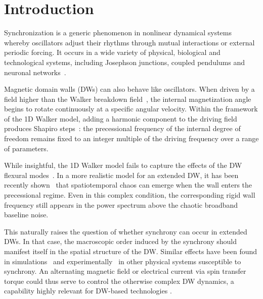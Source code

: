 \documentclass[prb,aps,twocolumn,superscriptaddress,floatfix]{revtex4-1}
\begin{document}
\maketitle


\section{Introduction}

Synchronization is a generic phenomenon in nonlinear dynamical systems whereby oscillators adjust their rhythms through mutual interactions or external periodic forcing. It occurs in a wide variety of physical, biological and technological systems, including Josephson junctions, coupled pendulums and neuronal networks~\cite{Strogatz2015,Pikovsky_Rosenblum_Kurths_2001}.

Magnetic domain walls (DWs) can also behave like oscillators. When driven by a field higher than the Walker breakdown field~\cite{Schryer1974}, the internal magnetization angle begins to rotate continuously at a specific angular velocity. Within the framework of the 1D Walker model, adding a harmonic component to the driving field produces Shapiro steps~\cite{shapiro1963josephson,berger1991prediction,kim2019}: the precessional frequency of the internal degree of freedom remains fixed to an integer multiple of the driving frequency over a range of parameters.

While insightful, the 1D Walker model fails to capture the effects of the DW flexural modes~\cite{thevenard2011domain,gourdon2013domain,Kim2024}.
In a more realistic model for an extended DW, it has been recently shown~\cite{pusiol2026deterministic} that spatiotemporal chaos can emerge when the wall enters the precessional regime. Even in this complex condition, the corresponding rigid wall frequency still appears in the power spectrum above the chaotic broadband baseline noise.

This naturally raises the question of whether synchrony can occur in extended DWs. In that case, the macroscopic order induced by the synchrony should manifest itself in the spatial structure of the DW. Similar effects have been found in simulations~\cite{koltonmodelocking,koltonmodelocking2} and experimentally~\cite{okumasuppresion} in other physical systems susceptible to synchrony. An alternating magnetic field or electrical current via spin transfer torque could thus serve to control the otherwise complex DW dynamics, a capability highly relevant for DW-based technologies \cite{Parkin2008,kim2019,Moon_2017,Munsu2021}.
\end{document}
